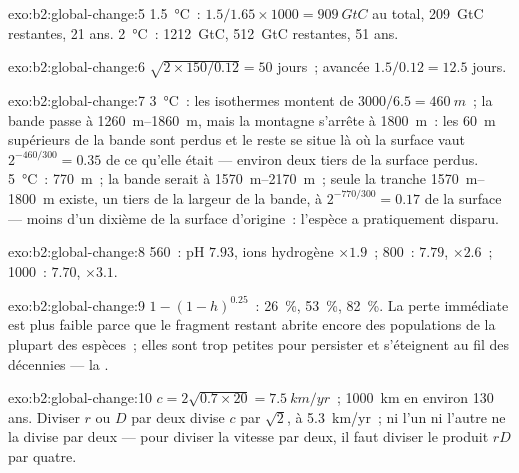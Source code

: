 \begin{solution}{exo:b2:global-change:5}
\qty{1.5}{\celsius}~: $1.5/1.65\times 1000 = \qty{909}{GtC}$ au total,
\qty{209}{GtC} restantes, 21 ans. \qty{2}{\celsius}~:
\qty{1212}{GtC}, \qty{512}{GtC} restantes, 51 ans.
\end{solution}

\begin{solution}{exo:b2:global-change:6}
$\sqrt{2\times 150/0.12} = 50$ jours~; avancée $1.5/0.12 = 12.5$
jours.
\end{solution}

\begin{solution}{exo:b2:global-change:7}
\qty{3}{\celsius}~: les isothermes montent de $3000/6.5 = \qty{460}{m}$~;
la bande passe à \qtyrange{1260}{1860}{m}, mais la montagne s'arrête à
\qty{1800}{m}~: les \qty{60}{m} supérieurs de la bande sont perdus et le
reste se situe là où la surface vaut $2^{-460/300} = 0.35$ de ce qu'elle
était --- environ deux tiers de la surface perdus. \qty{5}{\celsius}~:
\qty{770}{m}~; la bande serait à \qtyrange{1570}{2170}{m}~; seule la
tranche \qtyrange{1570}{1800}{m} existe, un tiers de la largeur de la
bande, à $2^{-770/300} = 0.17$ de la surface --- moins d'un dixième de la
surface d'origine~: l'espèce a pratiquement disparu.
\end{solution}

\begin{solution}{exo:b2:global-change:8}
560~: pH $7.93$, ions hydrogène $\times 1.9$~; 800~: $7.79$, $\times
2.6$~; 1000~: $7.70$, $\times 3.1$.
\end{solution}

\begin{solution}{exo:b2:global-change:9}
$1 - (1 - h)^{0.25}$~: \qty{26}{\%}, \qty{53}{\%}, \qty{82}{\%}. La
perte immédiate est plus faible parce que le fragment restant abrite
encore des populations de la plupart des espèces~; elles sont trop
petites pour persister et s'éteignent au fil des décennies --- la .
\end{solution}

\begin{solution}{exo:b2:global-change:10}
$c = 2\sqrt{0.7\times 20} = \qty{7.5}{km/yr}$~; \qty{1000}{km} en
environ 130 ans. Diviser $r$ ou $D$ par deux divise $c$ par
$\sqrt 2$, à \qty{5.3}{km/yr}~; ni l'un ni l'autre ne la divise par deux
--- pour diviser la vitesse par deux, il faut diviser le produit $rD$ par
quatre.
\end{solution}

